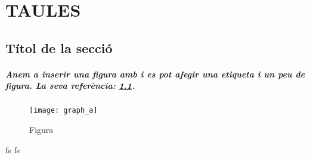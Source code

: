 \chapter{\uppercase{Taules}}
\section{Títol de la secció}
\paragraph{Anem a inserir una figura amb i es pot afegir una etiqueta i un peu de figura. La seva referència: \ref{fig:x cubed graph}.}
\begin{figure}[H]
\centering
\texttt{[image: graph\_a]}
\caption{Figura}
\label{fig:x cubed graph}
\end{figure}
fs
fs
%
%
